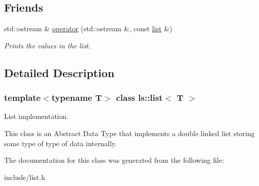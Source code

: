 \subsection*{Friends}
\begin{DoxyCompactItemize}
\item 
\mbox{\label{classls_1_1list_a0a2ac3f54c0cd7d0c0a1357ed1e4c5ea}} 
std\+::ostream \& \hyperlink{classls_1_1list_a0a2ac3f54c0cd7d0c0a1357ed1e4c5ea}{operator} (std\+::ostream \&, const \hyperlink{classls_1_1list}{list} \&)
\begin{DoxyCompactList}\small\item\em Prints the values in the list. \end{DoxyCompactList}\end{DoxyCompactItemize}


\subsection{Detailed Description}
\subsubsection*{template$<$typename T$>$\newline
class ls\+::list$<$ T $>$}

List implementation. 

This class is an Abstract Data Type that implements a double linked list storing some type of type of data internally. 

The documentation for this class was generated from the following file\+:\begin{DoxyCompactItemize}
\item 
include/list.\+h\end{DoxyCompactItemize}
